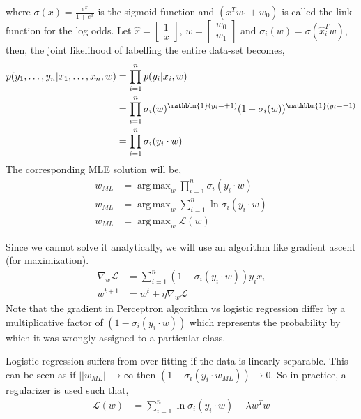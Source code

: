 \documentclass{article}
\DeclareMathOperator*{\argmax}{arg\,max}
\newcommand{\newpara}{\leavevmode\newline}
\newcommand{\xhat}{\hat{x}}
\begin{document}
where $\sigma(x) = \frac{e^x}{1+e^x}$ is the sigmoid function and $(x^Tw_1+w_0)$ is called the link function for the log odds.
\newpara
Let $\xhat = \begin{bmatrix}1\\x\end{bmatrix}$, $w = \begin{bmatrix}w_0\\w_1\end{bmatrix}$ and $\sigma_i(w) = \sigma(\xhat_i^Tw)$, then, the joint likelihood of labelling the entire data-set becomes,
\begin{align*}
    p(y_1,\dots,y_n | x_1, \dots, x_n, w) &= \prod_{i=1}^n p(y_i|x_i,w)\\
    &= \prod_{i=1}^n \sigma_i(w)^{\mathbbm{1}(y_i = +1)} (1-\sigma_i(w))^{\mathbbm{1}(y_i = -1)} \\
    &= \prod_{i=1}^n \sigma_i(y_i\cdot w) \\
\end{align*}
The corresponding MLE solution will be,
\begin{align*}
    w_{ML} & = \argmax_w \prod_{i=1}^n \sigma_i(y_i\cdot w) \\
    w_{ML} & = \argmax_w \sum_{i=1}^n{\ln{\sigma_i(y_i\cdot w)} }\\
    w_{ML} & = \argmax_w \mathcal{L}(w) 
\end{align*}

Since we cannot solve it analytically, we will use an algorithm like gradient ascent (for maximization).
\begin{align*}
    \nabla_w \mathcal{L} &= \sum_{i=1}^n (1-\sigma_i(y_i \cdot w))y_ix_i\\
    w^{t+1} &= w^t + \eta \nabla_w\mathcal{L}
\end{align*}
Note that the gradient in Perceptron algorithm vs logistic regression differ by a multiplicative factor of $(1-\sigma_i(y_i\cdot w))$ which represents the probability by which it was wrongly assigned to a particular class.

\newpara
Logistic regression suffers from over-fitting if the data is linearly separable. This can be seen as if $||w_{ML}|| \to \infty$ then $(1-\sigma_i(y_i\cdot w_{ML})) \to 0$. So in practice, a regularizer is used such that,
\begin{align*}
    \mathcal{L}(w) &= \sum_{i=1}^n{\ln{\sigma_i(y_i\cdot w)} } - \lambda w^Tw\\
\end{align*}
\end{document}
